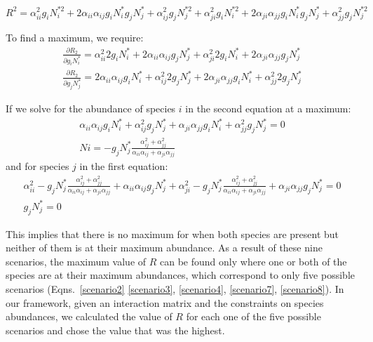 \begin{refsection}
\begin{equation}
\label{R2expanded}
R^{2} =  \alpha_{ii}^{2}g_{i}N_{i}^{*2} + 2 \alpha_{ii}\alpha_{ij}g_{i}N_{i}^{*}g_{j}N_{j}^{*} +\alpha_{ij}^{2} g_{j}N_{j}^{*2} +\alpha_{ji}^{2} g_{i}N_{i}^{*2}
+  2 \alpha_{ji}\alpha_{jj}g_{i}N_{i}^{*}g_{j}N_{j}^{*}  + \alpha_{jj}^{2} g_{j}N_{j}^{*2}
\end{equation}

To find a maximum, we require:
\begin{eqnarray}
  \frac{\partial R_{2}}{\partial g_{i}N_{i}^{*}} = \alpha_{ii}^{2}2g_{i}N_{i}^{*} + 2\alpha_{ii}\alpha_{ij}g_{j}N_{j}^{*} + \alpha_{ji}^{2}2g_{i}N_{i}^{*} + 2\alpha_{ji}\alpha_{jj}g_{j}N_{j}^{*}\\
\frac{\partial R_{2}}{\partial g_{j}N_{j}^{*}}  = 2\alpha_{ii}\alpha_{ij}g_{i}N_{i}^{*} + \alpha_{ij}^{2}2g_{j}N_{j}^{*} + 2\alpha_{ji}\alpha_{jj} g_{i}N_{i}^{*} + \alpha_{jj}^{2}2g_{j}N_{j}^{*}
\end{eqnarray}

If we solve for the abundance of species $i$ in the second equation at a maximum:
\begin{eqnarray}
 \alpha_{ii}\alpha_{ij}g_{i}N_{i}^{*} + \alpha_{ij}^{2}g_{j}N_{j}^{*} + \alpha_{ji}\alpha_{jj}g_{i}N_{i}^{*} + \alpha_{jj}^{2}g_{j}N_{j}^{*}= 0 \\
  N{i} = - g_{j}N_{j}^{*}\frac{\alpha_{ij}^{2} + \alpha_{jj}^{2}}{ \alpha_{ii}\alpha_{ij} + \alpha_{ji}\alpha_{jj}}
\end{eqnarray}
and for species $j$ in the first equation:
\begin{eqnarray}
 \alpha_{ii}^{2}- g_{j}N_{j}^{*}\frac{\alpha_{ij}^{2} + \alpha_{jj}^{2}}{ \alpha_{ii}\alpha_{ij} + \alpha_{ji}\alpha_{jj}} + \alpha_{ii}\alpha_{ij}g_{j}N_{j}^{*} + \alpha_{ji}^{2}- g_{j}N_{j}^{*}\frac{\alpha_{ij}^{2} + \alpha_{jj}^{2}}{ \alpha_{ii}\alpha_{ij} + \alpha_{ji}\alpha_{jj}} + \alpha_{ji}\alpha_{jj}g_{j}N_{j}^{*} = 0\\
g_{j}N_{j}^{*} = 0
\end{eqnarray}

This implies that there is no maximum for when both species are present but neither of them is at their maximum abundance. As a result of these nine scenarios, the maximum value of $R$ can be found only where one or both of the species are at their maximum abundances, which correspond to only five possible scenarios (Eqns.~\ref{scenario2} \ref{scenario3}, \ref{scenario4}, \ref{scenario7}, \ref{scenario8}). In our framework, given an interaction matrix and the constraints on species abundances, we calculated the value of $R$ for each one of the five possible scenarios and chose the value that was the highest.




\end{refsection}

